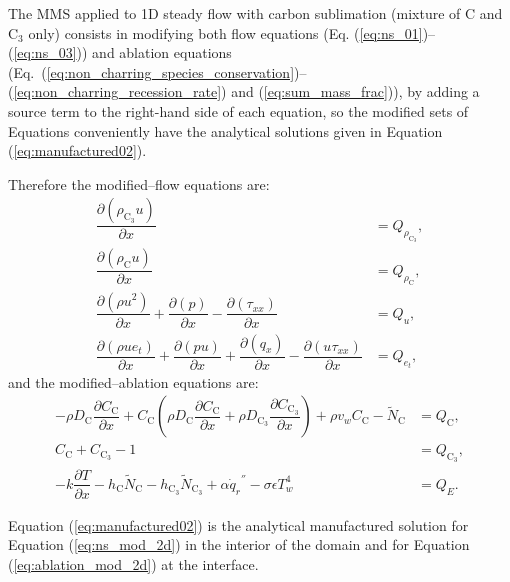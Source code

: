 \documentclass[10pt]{article}
\newcommand{\Diff}[2] {\dfrac{\partial( #1)}{\partial #2}}
\newcommand{\diff}[2] {\dfrac{\partial #1 }{\partial #2}}
\newcommand{\C}{\text{C}}
\begin{document}


The MMS applied to 1D steady flow with carbon sublimation (mixture of  C and C$_{3}$ only) consists in modifying both flow equations (Eq. (\ref{eq:ns_01})--(\ref{eq:ns_03}))  and ablation equations (Eq.~(\ref{eq:non_charring_species_conservation})--(\ref{eq:non_charring_recession_rate}) and (\ref{eq:sum_mass_frac})), by adding a source term to the right-hand side of each equation, so the modified sets of Equations conveniently have the analytical solutions given in Equation (\ref{eq:manufactured02}).

Therefore the modified--flow equations are:
\begin{equation}
 \label{eq:ns_mod_2d}
\begin{split}
\Diff{\rho_{\C_3} u}{x} &= Q_{\rho_{\C_3}},\\
\Diff{\rho_\C u}{x} &= Q_{\rho_\C},\\
\Diff{\rho u^2 }{x}+ \Diff{p}{x} -\Diff{\tau_{xx}}{x}&= Q_u,\\
\Diff{\rho ue_t}{x}+ \Diff{pu}{x}+ \Diff{q_x}{x}-\Diff{u\tau_{xx}}{x} &= Q_{e_t},
\end{split}
\end{equation}
and the modified--ablation equations are:
\begin{equation}
 \label{eq:ablation_mod_2d}
\begin{split}
-\rho D_\C \diff{C_\C}{x}+ C_\C \left(\rho D_\C \diff{C_\C}{x}+\rho D_{\C_3} \diff{C_{\C_3}}{x}\right)+\rho v_w C_\C-\tilde{N}_\C&=Q_{\C},\\
 C_\C+C_{\C_3} - 1&=Q_{\C_{3}},\\
-k \diff{T}{x}-h_\C \tilde{N}_\C - h_{\C_3} \tilde{N}_{\C_3}+ \alpha  {\dot{q}_r}^{''}-\sigma \epsilon T_w^4 &=Q_{E}.
\end{split}
\end{equation}

Equation (\ref{eq:manufactured02}) is the analytical manufactured solution for Equation (\ref{eq:ns_mod_2d}) in the interior of the domain and for Equation (\ref{eq:ablation_mod_2d}) at the interface.
\end{document}
